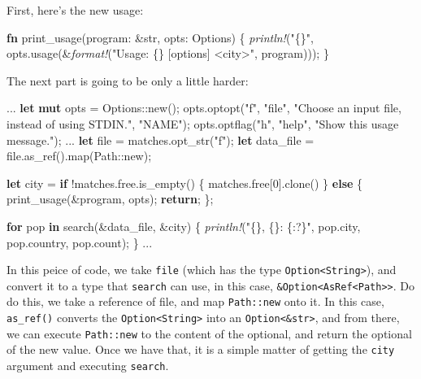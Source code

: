 \documentclass[a4paper,]{book}
\newenvironment{Shaded}{\begin{snugshade}}{\end{snugshade}}
\newcommand{\KeywordTok}[1]{\textcolor[rgb]{0.13,0.29,0.53}{\textbf{{#1}}}}
\newcommand{\DataTypeTok}[1]{\textcolor[rgb]{0.13,0.29,0.53}{{#1}}}
\newcommand{\DecValTok}[1]{\textcolor[rgb]{0.00,0.00,0.81}{{#1}}}
\newcommand{\StringTok}[1]{\textcolor[rgb]{0.31,0.60,0.02}{{#1}}}
\newcommand{\PreprocessorTok}[1]{\textcolor[rgb]{0.56,0.35,0.01}{\textit{{#1}}}}
\newcommand{\NormalTok}[1]{{#1}}
\begin{document}
First, here's the new usage:

\begin{Shaded}
\begin{Highlighting}[]
\KeywordTok{fn} \NormalTok{print_usage(program: &}\DataTypeTok{str}\NormalTok{, opts: Options) \{}
    \PreprocessorTok{println!}\NormalTok{(}\StringTok{"\{\}"}\NormalTok{, opts.usage(&}\PreprocessorTok{format!}\NormalTok{(}\StringTok{"Usage: \{\} [options] <city>"}\NormalTok{, program)));}
\NormalTok{\}}
\end{Highlighting}
\end{Shaded}

The next part is going to be only a little harder:

\begin{Shaded}
\begin{Highlighting}[]
\NormalTok{...}
\KeywordTok{let} \KeywordTok{mut} \NormalTok{opts = Options::new();}
\NormalTok{opts.optopt(}\StringTok{"f"}\NormalTok{, }\StringTok{"file"}\NormalTok{, }\StringTok{"Choose an input file, instead of using STDIN."}\NormalTok{, }\StringTok{"NAME"}\NormalTok{);}
\NormalTok{opts.optflag(}\StringTok{"h"}\NormalTok{, }\StringTok{"help"}\NormalTok{, }\StringTok{"Show this usage message."}\NormalTok{);}
\NormalTok{...}
\KeywordTok{let} \NormalTok{file = matches.opt_str(}\StringTok{"f"}\NormalTok{);}
\KeywordTok{let} \NormalTok{data_file = file.as_ref().map(Path::new);}

\KeywordTok{let} \NormalTok{city = }\KeywordTok{if} \NormalTok{!matches.free.is_empty() \{}
    \NormalTok{matches.free[}\DecValTok{0}\NormalTok{].clone()}
\NormalTok{\} }\KeywordTok{else} \NormalTok{\{}
    \NormalTok{print_usage(&program, opts);}
    \KeywordTok{return}\NormalTok{;}
\NormalTok{\};}

\KeywordTok{for} \NormalTok{pop }\KeywordTok{in} \NormalTok{search(&data_file, &city) \{}
    \PreprocessorTok{println!}\NormalTok{(}\StringTok{"\{\}, \{\}: \{:?\}"}\NormalTok{, pop.city, pop.country, pop.count);}
\NormalTok{\}}
\NormalTok{...}
\end{Highlighting}
\end{Shaded}

In this peice of code, we take \texttt{file} (which has the type
\texttt{Option\textless{}String\textgreater{}}), and convert it to a
type that \texttt{search} can use, in this case,
\texttt{\&Option\textless{}AsRef\textless{}Path\textgreater{}\textgreater{}}.
Do do this, we take a reference of file, and map \texttt{Path::new} onto
it. In this case, \texttt{as\_ref()} converts the
\texttt{Option\textless{}String\textgreater{}} into an
\texttt{Option\textless{}\&str\textgreater{}}, and from there, we can
execute \texttt{Path::new} to the content of the optional, and return
the optional of the new value. Once we have that, it is a simple matter
of getting the \texttt{city} argument and executing \texttt{search}.
\end{document}
